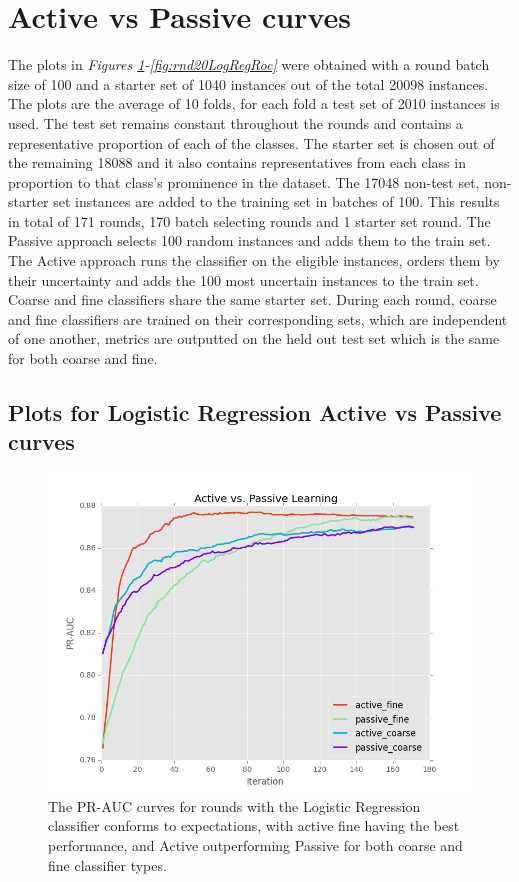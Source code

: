 \documentclass[ms]{nuthesis}
\begin{document}
\section{Active vs Passive curves}
\label{sect:actpass}
\par The plots in \textit{Figures \ref{fig:runActPassLogReg_pr}-\ref{fig:rnd20LogRegRoc}}
were obtained with a round batch size of 100
and a starter set of 1040 instances out of the total 20098 instances.
The plots are the average of 10 folds, for each fold a test set of 2010 instances
is used. The test set remains constant throughout the rounds and contains a representative proportion
 of each of the classes. The starter set is chosen out of the remaining 18088 and it also contains representatives
 from each class in proportion to that class's prominence in the dataset. The 17048 non-test set, non-starter set
  instances are added to the training set in batches of 100. This results in total of 171 rounds, 170 batch selecting
  rounds and 1 starter set round. The Passive approach selects 100 random instances
   and adds them to the train set. The Active approach runs the classifier on the eligible instances, orders them
   by their uncertainty and adds the 100 most uncertain instances to the train set. Coarse and fine classifiers
   share the same starter set. During each round, coarse and fine classifiers are trained on their corresponding
 sets, which are independent of one another, metrics are outputted on the held out test set which is the same for
 both coarse and fine.


\FloatBarrier
\subsection{Plots for Logistic Regression Active vs Passive curves}
\begin{figure}[!htb]
	\centering
    \includegraphics[width=1.0\columnwidth]{fig/runActPassLogReg_pr}
    \caption{The PR-AUC curves for rounds with the Logistic
Regression classifier conforms to expectations, with active fine having
the best performance, and Active outperforming Passive for both coarse
and fine classifier types.}
\label{fig:runActPassLogReg_pr}
\end{figure}
\FloatBarrier
\end{document}
